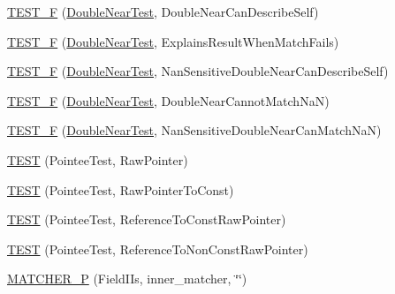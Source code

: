 \begin{DoxyCompactItemize}
\item 
\mbox{\hyperlink{namespacetesting_1_1gmock__matchers__test_a31d14a68cacbaab3fafd26247cc11f9c}{T\+E\+S\+T\+\_\+F}} (\mbox{\hyperlink{namespacetesting_1_1gmock__matchers__test_aea537d0183ccc65b5c49a75d711993c8}{Double\+Near\+Test}}, Double\+Near\+Can\+Describe\+Self)
\item 
\mbox{\hyperlink{namespacetesting_1_1gmock__matchers__test_a4250d3de38128f3452a0a9e93173bdb4}{T\+E\+S\+T\+\_\+F}} (\mbox{\hyperlink{namespacetesting_1_1gmock__matchers__test_aea537d0183ccc65b5c49a75d711993c8}{Double\+Near\+Test}}, Explains\+Result\+When\+Match\+Fails)
\item 
\mbox{\hyperlink{namespacetesting_1_1gmock__matchers__test_ad147bef4b26c0a060cb4d25fe517a3e3}{T\+E\+S\+T\+\_\+F}} (\mbox{\hyperlink{namespacetesting_1_1gmock__matchers__test_aea537d0183ccc65b5c49a75d711993c8}{Double\+Near\+Test}}, Nan\+Sensitive\+Double\+Near\+Can\+Describe\+Self)
\item 
\mbox{\hyperlink{namespacetesting_1_1gmock__matchers__test_a9542b930e1de4d087a8655855edcc13c}{T\+E\+S\+T\+\_\+F}} (\mbox{\hyperlink{namespacetesting_1_1gmock__matchers__test_aea537d0183ccc65b5c49a75d711993c8}{Double\+Near\+Test}}, Double\+Near\+Cannot\+Match\+NaN)
\item 
\mbox{\hyperlink{namespacetesting_1_1gmock__matchers__test_a7c8d850697cb6cc030a4b05eeecffb72}{T\+E\+S\+T\+\_\+F}} (\mbox{\hyperlink{namespacetesting_1_1gmock__matchers__test_aea537d0183ccc65b5c49a75d711993c8}{Double\+Near\+Test}}, Nan\+Sensitive\+Double\+Near\+Can\+Match\+NaN)
\item 
\mbox{\hyperlink{namespacetesting_1_1gmock__matchers__test_ad6a13303d164fa9ca035a137840b78cb}{T\+E\+ST}} (Pointee\+Test, Raw\+Pointer)
\item 
\mbox{\hyperlink{namespacetesting_1_1gmock__matchers__test_a84a21ee7de697401049cb932f859ee33}{T\+E\+ST}} (Pointee\+Test, Raw\+Pointer\+To\+Const)
\item 
\mbox{\hyperlink{namespacetesting_1_1gmock__matchers__test_aebba40e49fe790490ba88984fdc7c7a6}{T\+E\+ST}} (Pointee\+Test, Reference\+To\+Const\+Raw\+Pointer)
\item 
\mbox{\hyperlink{namespacetesting_1_1gmock__matchers__test_a2d2296f6b23130be225b8df48746dfd5}{T\+E\+ST}} (Pointee\+Test, Reference\+To\+Non\+Const\+Raw\+Pointer)
\item 
\mbox{\hyperlink{namespacetesting_1_1gmock__matchers__test_a3d3f285bba1766bf9daf840a16e79924}{M\+A\+T\+C\+H\+E\+R\+\_\+P}} (Field\+I\+Is, inner\+\_\+matcher, \char`\"{}\char`\"{})

\end{DoxyCompactItemize}
